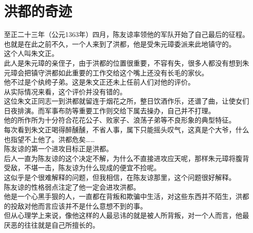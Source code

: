 \section{洪都的奇迹}
\ifnum{}
	\begin{multicols}{\theparacolNo}
\fi
至正二十三年（公元1363年）四月，陈友谅率领他的军队开始了自己最后的征程。\\

也就是在此之前不久，一个人来到了洪都，他是受朱元璋委派来此地镇守的。\\

这个人叫朱文正。\\

此人是朱元璋的亲侄子，由于洪都的位置很重要，不容有失，很多人都没有想到朱元璋会把镇守洪都如此重要的工作交给这个嘴上还没有长毛的家伙。\\

他不过是个纨绔子弟。这是朱文正还未上任前人们对他的评价。\\

从实际情况来看，这个评价并没有错的。\\

这位朱文正同志一到洪都就留连于烟花之所，整日饮酒作乐，还谱了曲，让使女们日夜排演。而军事布防等重要工作则交给下属去操办，自己并不打理。\\

他的所作所为十分符合花花公子、败家子、浪荡子弟等不良形象的典型特征。\\

每次看到朱文正喝得醉醺醺，不省人事，属下只能摇头叹气，这真是个大爷，什么也指望不上他了。洪都危矣……\\

陈友谅的第一个进攻目标正是洪都。\\

后人一直为陈友谅的这个决定不解，为什么不直接进攻应天呢，那样朱元璋将腹背受敌，不堪一击，陈友谅为什么现成的便宜不捡呢。\\

这似乎是个很难解释的问题，但我相信，在陈友谅那里，这个问题很好解释。\\

陈友谅的性格弱点注定了他一定会进攻洪都。\\

他是一个心黑手狠的人，一直都在背叛和欺骗中生活，对这些东西并不陌生，洪都的投敌对他而言应该并不是什么意想不到的事。\\

但从心理学上来说，像他这样的人最忌讳的就是被人所背叛，对一个人而言，他最厌恶的往往就是自己所擅长的。\\


\end{multicols}
